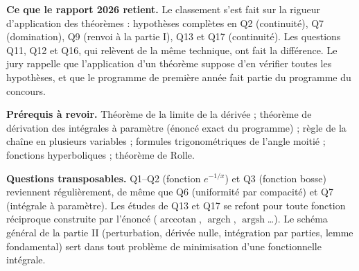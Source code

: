 \documentclass[11pt,a4paper]{article}
\begin{document}
\textbf{Ce que le rapport 2026 retient.} Le classement s'est fait sur la rigueur d'application des théorèmes : hypothèses complètes en Q2 (continuité), Q7 (domination), Q9 (renvoi à la partie I), Q13 et Q17 (continuité). Les questions Q11, Q12 et Q16, qui relèvent de la même technique, ont fait la différence. Le jury rappelle que l'application d'un théorème suppose d'en vérifier toutes les hypothèses, et que le programme de première année fait partie du programme du concours.

\textbf{Prérequis à revoir.} Théorème de la limite de la dérivée ; théorème de dérivation des intégrales à paramètre (énoncé exact du programme) ; règle de la chaîne en plusieurs variables ; formules trigonométriques de l'angle moitié ; fonctions hyperboliques ; théorème de Rolle.

\textbf{Questions transposables.} Q1--Q2 (fonction \(e^{-1/x}\)) et Q3 (fonction bosse) reviennent régulièrement, de même que Q6 (uniformité par compacité) et Q7 (intégrale à paramètre). Les études de Q13 et Q17 se refont pour toute fonction réciproque construite par l'énoncé (\(\operatorname{arccotan}\), \(\operatorname{argch}\), \(\operatorname{argsh}\)\ldots). Le schéma général de la partie II (perturbation, dérivée nulle, intégration par parties, lemme fondamental) sert dans tout problème de minimisation d'une fonctionnelle intégrale.
\end{document}
